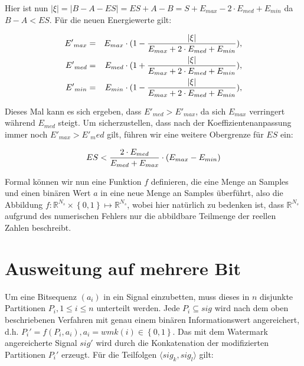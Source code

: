 Hier ist nun  $|\xi| = |B-A-ES| = ES+A-B = S + {E}_{max} - 2\cdot {E}_{med} + {E}_{min}$ da $B-A<ES$. Für die neuen Energiewerte gilt:

	 \begin{eqnarray*}
		 {E'}_{max} & = & {E}_{max} \cdot (1 - { |\xi| \over {{E}_{max} + 2\cdot {E}_{med} + {E}_{min}} }),
		 \\ 
		 {E'}_{med} & = & {E}_{med} \cdot (1 + { |\xi| \over {{E}_{max} + 2\cdot {E}_{med} + {E}_{min}} }),
		 \\
		 {E'}_{min} & = & {E}_{min} \cdot (1 - { |\xi| \over {{E}_{max} + 2\cdot {E}_{med} + {E}_{min}} }),
	\end{eqnarray*}
	
Dieses Mal kann es sich ergeben, dass ${E'}_{med} > {E'}_{max}$, da sich ${E}_{max}$ verringert während ${E}_{med}$ steigt. Um sicherzustellen, dass nach der Koeffizientenanpassung immer noch ${E'}_{max} > {E'}_med$ gilt, führen wir eine weitere Obergrenze für $ES$ ein:

	\begin{equation}
		ES < { 2 \cdot {E}_{med} \over {E}_{med} + {E}_{max} } \cdot ( {E}_{max} - {E}_{min} )
		\label{equ:embeddingstrengthconstraint_case2}
	\end{equation}

Formal können wir nun eine Funktion $f$ definieren, die eine Menge an Samples und einen binären Wert $a$ in eine neue Menge an Samples überführt, also die Abbildung $f: {\mathbb{R}}^{{N}_{s}} \times \left\{0,1\right\} \mapsto  {\mathbb{R}}^{{N}_{s}}$, wobei hier natürlich zu bedenken ist, dass ${\mathbb{R}}^{{N}_{s}}$ aufgrund des numerischen Fehlers nur die abbildbare Teilmenge der reellen Zahlen beschreibt. 

\section{Ausweitung auf mehrere Bit}
\label{sec:embeddingstragety_bitsequence}

Um eine Bitsequenz $({a}_{i})$ in ein Signal einzubetten, muss dieses in $n$ disjunkte Partitionen ${P}_{i}, {1}\leq{i}\leq{n}$ unterteilt werden. Jede ${P}_{i}\subseteq{sig}$ wird nach dem oben beschriebenen Verfahren mit genau einem binären Informationswert angereichert, d.h. ${P}_{i}'=f({P}_{i}, {a}_{i}), {a}_{i} = wmk(i)\in\left\{0,1\right\}$. Das mit dem Watermark angereicherte Signal $sig'$ wird durch die Konkatenation der modifizierten Partitionen ${P}_{i}'$ erzeugt. Für die Teilfolgen $\langle{sig}_{k},{sig}_{l}\rangle$ gilt:

